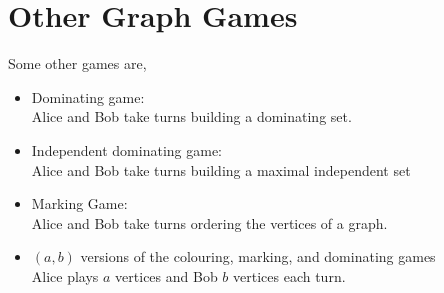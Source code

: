 \documentclass[handout]{beamer}
\begin{document}
\section{Other Graph Games}


\begin{frame}{\secname}
    
    Some other games are,
    \begin{itemize}
        \item Dominating game: \\
        Alice and Bob take turns building a dominating set.
        \item Independent dominating game: \\
        Alice and Bob take turns building a maximal independent set    
        \item Marking Game: \\
        Alice and Bob take turns ordering the vertices of a graph.
        \item $(a,b)$ versions of the colouring, marking, and dominating games \\
        Alice plays $a$ vertices and Bob $b$ vertices each turn.
    \end{itemize}
    
\end{frame}
\end{document}
